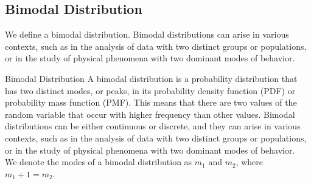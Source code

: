 \documentclass[openany]{book}
\begin{document}
\subsection{Bimodal Distribution}
We define a bimodal distribution. Bimodal distributions can arise in various contexts, such as in the analysis of data with two distinct groups or populations, or in the study of physical phenomena with two dominant modes of behavior.
\begin{mydefinition}{Bimodal Distribution}
    A bimodal distribution is a probability distribution that has two distinct modes, or peaks, in its probability density function (PDF) or probability mass function (PMF). This means that there are two values of the random variable that occur with higher frequency than other values. Bimodal distributions can be either continuous or discrete, and they can arise in various contexts, such as in the analysis of data with two distinct groups or populations, or in the study of physical phenomena with two dominant modes of behavior. \\
    We denote the modes of a bimodal distribution as $m_1$ and $m_2$, where $m_1 + 1 = m_2$.
\end{mydefinition}
\end{document}
